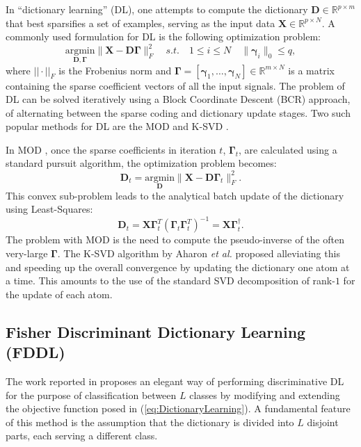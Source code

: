 \documentclass[journal]{IEEEtran}
\newcommand{\bD}{\mathbf{D}}
\newcommand{\bX}{\mathbf{X}}
\newcommand{\bGamma}{\boldsymbol{\Gamma}}
\newcommand{\bgamma}{\boldsymbol{\gamma}}
\begin{document}
In ``dictionary learning'' (DL), one attempts to compute the dictionary $\bD \in \mathbb{R}^{p \times m}$ that best sparsifies a set of examples, serving as the input data $\bX \in \mathbb{R}^{p \times N}$. A commonly used formulation for DL is the following optimization problem:
\begin{equation}\label{eq:DictionaryLearning}
    \underset{\bD,\bGamma}{\text{argmin}} \| \bX - \bD \bGamma \|_F^2 \quad s.t. \quad 1 \le i\le N \quad
    \| \bgamma_i \|_0   \leq  \mathit{q},
\end{equation}
where $||\cdot||_F$ is the Frobenius norm and $\bGamma = \left[\bgamma_1,\ldots,\bgamma_N\right] \in \mathbb{R}^{m \times N}$ is a matrix containing the sparse coefficient vectors of all the input signals. The problem of DL can be solved iteratively using a Block Coordinate Descent (BCR) approach, of alternating between the sparse coding and dictionary update stages. Two such popular methods for DL are the MOD \cite{MOD} and K-SVD \cite{KSVD}.

In MOD \cite{MOD}, once the sparse coefficients in iteration $t$, $\bGamma_t$, are calculated using a standard pursuit algorithm, the optimization problem becomes:
\begin{equation}\label{eq:MOD1}
\bD_{t}=\underset{\bD}{\text{argmin}} \| \bX - \bD \bGamma_t \|_F^2.
\end{equation}
This convex sub-problem leads to the analytical batch update of the dictionary using Least-Squares:
\begin{equation}\label{eq:MOD2}
\bD_{t} = \bX \bGamma_t^T (\bGamma_t \bGamma_t^T)^{-1} = \bX \bGamma_t^{\dagger}.
\end{equation}
The problem with MOD is the need to compute the pseudo-inverse of the often very-large $\bGamma$. The K-SVD algorithm by Aharon \textit{et al.} \cite{KSVD} proposed alleviating this and speeding up the overall convergence by updating the dictionary one atom at a time.
This amounts to the use of the standard SVD decomposition of rank-$1$ for the update of each atom.

\subsection{Fisher Discriminant Dictionary Learning (FDDL)}

The work reported in \cite{FDDL} proposes an elegant way of performing discriminative DL for the purpose of classification between $L$ classes by modifying and extending the objective function posed in (\ref{eq:DictionaryLearning}). A fundamental feature of this method is the assumption that the dictionary is divided into $L$ disjoint parts, each serving a different class.
\end{document}
